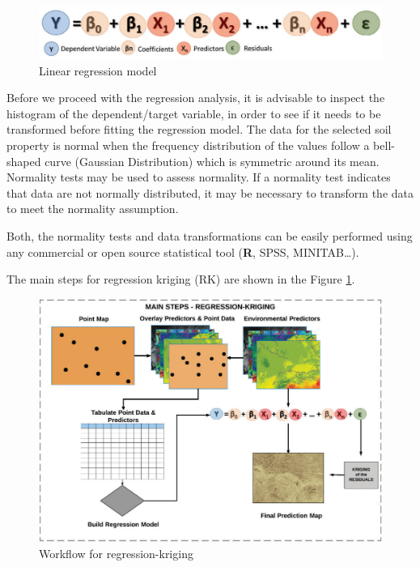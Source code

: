 \documentclass[10pt,b5paper,]{book}
\theoremstyle{definition}
\theoremstyle{definition}
\theoremstyle{definition}
\theoremstyle{remark}
\begin{document}
\begin{figure}
\centering
\includegraphics{images/RKequation.png}
\caption{Linear regression model}
\end{figure}

Before we proceed with the regression analysis, it is advisable to
inspect the histogram of the dependent/target variable, in order to see
if it needs to be transformed before fitting the regression model. The
data for the selected soil property is normal when the frequency
distribution of the values follow a bell-shaped curve (Gaussian
Distribution) which is symmetric around its mean. Normality tests may be
used to assess normality. If a normality test indicates that data are
not normally distributed, it may be necessary to transform the data to
meet the normality assumption.

Both, the normality tests and data transformations can be easily
performed using any commercial or open source statistical tool
(\textbf{R}, SPSS, MINITAB\ldots{}).

The main steps for regression kriging (RK) are shown in the Figure
\ref{fig:workflowRK}.

\begin{figure}

{\centering \includegraphics[width=0.8\linewidth]{images/RKworkflow} 

}

\caption{Workflow for regression-kriging}\label{fig:workflowRK}
\end{figure}
\end{document}
